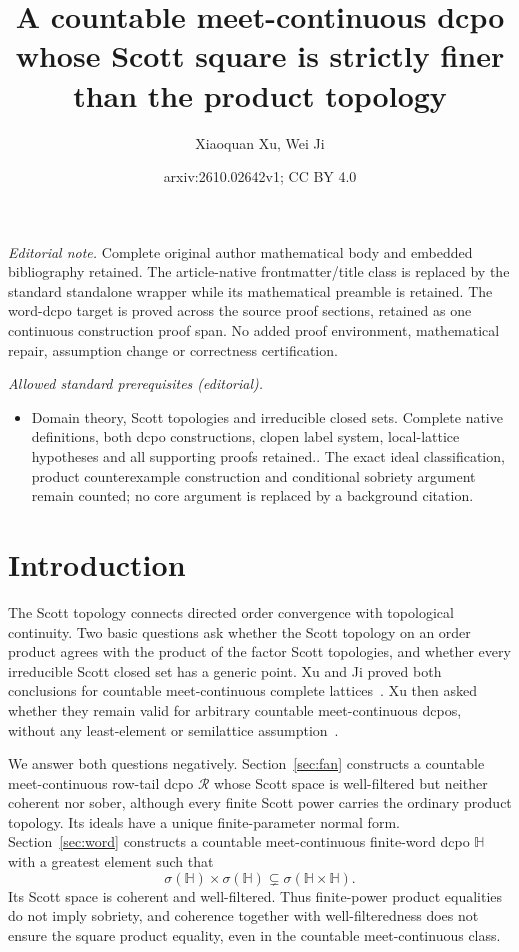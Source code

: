 \documentclass[10pt,a4paper]{article}
\title{A countable meet-continuous dcpo whose Scott square is strictly finer than the product topology}
\author{Xiaoquan Xu, Wei Ji}
\date{arxiv:2610.02642v1; CC BY 4.0}
\theoremstyle{definition}
\newcommand{\HH}{\mathbb H}
\newcommand{\RR}{\mathcal R}
\begin{document}
\maketitle
\noindent\textit{Editorial note.} Complete original author mathematical body and embedded bibliography retained. The article-native frontmatter/title class is replaced by the standard standalone wrapper while its mathematical preamble is retained. The word-dcpo target is proved across the source proof sections, retained as one continuous construction proof span. No added proof environment, mathematical repair, assumption change or correctness certification.\par\medskip
\noindent\textit{Allowed standard prerequisites (editorial).}\begin{itemize}
\item Domain theory, Scott topologies and irreducible closed sets. Complete native definitions, both dcpo constructions, clopen label system, local-lattice hypotheses and all supporting proofs retained.. The exact ideal classification, product counterexample construction and conditional sobriety argument remain counted; no core argument is replaced by a background citation.
\end{itemize}\medskip
\section{Introduction}\label{sec:intro}
The Scott topology connects directed order convergence with topological continuity. Two basic questions ask whether the Scott topology on an order product agrees with the product of the factor Scott topologies, and whether every irreducible Scott closed set has a generic point. Xu and Ji proved both conclusions for countable meet-continuous complete lattices~\cite[Theorem~1.1]{XuJi}. Xu then asked whether they remain valid for arbitrary countable meet-continuous dcpos, without any least-element or semilattice assumption~\cite[Questions~1.1 and~1.2]{Xu}.

We answer both questions negatively. Section~\ref{sec:fan} constructs a countable meet-continuous row-tail dcpo $\RR$ whose Scott space is well-filtered but neither coherent nor sober, although every finite Scott power carries the ordinary product topology. Its ideals have a unique finite-parameter normal form. Section~\ref{sec:word} constructs a countable meet-continuous finite-word dcpo $\HH$ with a greatest element such that
\[
 \sigma(\HH)\times\sigma(\HH)\subsetneq\sigma(\HH\times\HH).
\]
Its Scott space is coherent and well-filtered. Thus finite-power product equalities do not imply sobriety, and coherence together with well-filteredness does not ensure the square product equality, even in the countable meet-continuous class.
\end{document}
